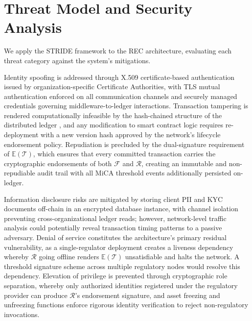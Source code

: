 \documentclass[journal,10pt,twocolumn]{IEEEtran}
\begin{document}
\section{Threat Model and Security Analysis}
\label{sec:threat}

We apply the STRIDE framework \cite{ref:stride} to the REC architecture, evaluating each threat category against the system's mitigations.

Identity spoofing is addressed through X.509 certificate-based authentication issued by organization-specific Certificate Authorities, with TLS mutual authentication enforced on all communication channels and securely managed credentials governing middleware-to-ledger interactions. Transaction tampering is rendered computationally infeasible by the hash-chained structure of the distributed ledger \cite{ref:fabric}, and any modification to smart contract logic requires re-deployment with a new version hash approved by the network's lifecycle endorsement policy. Repudiation is precluded by the dual-signature requirement of $\mathbb{E}(\mathcal{T})$, which ensures that every committed transaction carries the cryptographic endorsements of both $\mathcal{F}$ and $\mathcal{R}$, creating an immutable and non-repudiable audit trail with all MiCA threshold events additionally persisted on-ledger.

Information disclosure risks are mitigated by storing client PII and KYC documents off-chain in an encrypted database instance, with channel isolation preventing cross-organizational ledger reads; however, network-level traffic analysis could potentially reveal transaction timing patterns to a passive adversary. Denial of service constitutes the architecture's primary residual vulnerability, as a single-regulator deployment creates a liveness dependency whereby $\mathcal{R}$ going offline renders $\mathbb{E}(\mathcal{T})$ unsatisfiable and halts the network. A threshold signature scheme \cite{ref:threshold_sig} across multiple regulatory nodes would resolve this dependency. Elevation of privilege is prevented through cryptographic role separation, whereby only authorized identities registered under the regulatory provider can produce $\mathcal{R}$'s endorsement signature, and asset freezing and unfreezing functions enforce rigorous identity verification to reject non-regulatory invocations.

\end{document}

